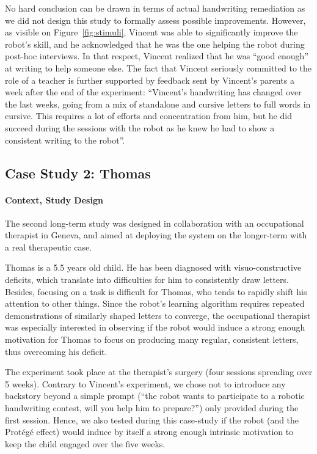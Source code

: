 \documentclass{article}
\begin{document}
No hard conclusion can be drawn in terms of actual handwriting remediation as we
did not design this study to formally assess possible improvements. However, as
visible on Figure~\ref{fig:stimuli}, Vincent was able to significantly improve
the robot's skill, and  he acknowledged that he was the one helping the robot
during post-hoc interviews. In that respect, Vincent realized that he was ``good
enough'' at writing to help someone else. The fact that Vincent seriously
committed to the role of a teacher is further supported by feedback sent by
Vincent's parents a week after the end of the experiment: ``Vincent's
handwriting has changed over the last weeks, going from a mix of standalone and
cursive letters to full words in cursive. This requires a lot of efforts and
concentration from him, but he did succeed during the sessions with the robot as
he knew he had to show a consistent writing to the robot''.


\subsection{Case Study 2: Thomas}

\paragraph{Context, Study Design}

The second long-term study was designed in collaboration with an occupational
therapist in Geneva, and aimed at deploying the system on the longer-term with a
real therapeutic case.

Thomas is a 5.5 years old child. He has been diagnosed with visuo-constructive
deficits, which translate into difficulties for him to consistently draw
letters. Besides, focusing on a task is difficult for Thomas, who tends to
rapidly shift his attention to other things. Since the robot's learning
algorithm requires repeated demonstrations of similarly shaped letters to
converge, the occupational therapist was especially interested in observing if
the robot would induce a strong enough motivation for Thomas to focus on
producing many regular, consistent letters, thus overcoming his deficit.

The experiment took place at the therapist's surgery (four sessions spreading
over 5 weeks). Contrary to Vincent's experiment, we chose not to introduce any
backstory beyond a simple prompt (``the robot wants to participate to a robotic
handwriting contest, will you help him to prepare?'') only provided during the
first session. Hence, we also tested during this case-study if the robot (and
the Protégé effect) would induce by itself a strong enough intrinsic motivation
to keep the child engaged over the five weeks.
\end{document}
